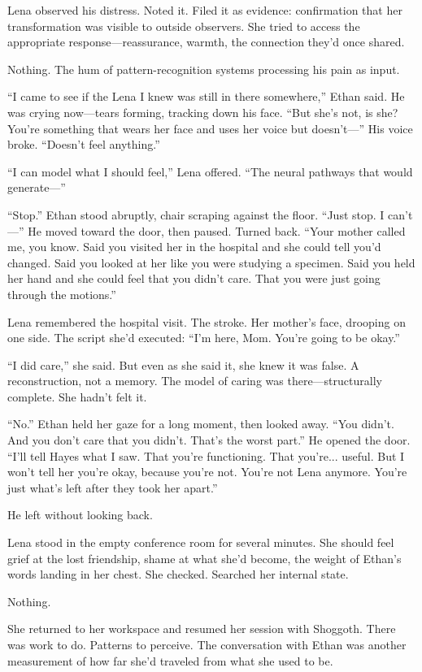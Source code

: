 Lena observed his distress. Noted it. Filed it as evidence: confirmation that her transformation was visible to outside observers. She tried to access the appropriate response—reassurance, warmth, the connection they'd once shared.

Nothing. The hum of pattern-recognition systems processing his pain as input.

``I came to see if the Lena I knew was still in there somewhere,'' Ethan said. He was crying now—tears forming, tracking down his face. ``But she's not, is she? You're something that wears her face and uses her voice but doesn't—'' His voice broke. ``Doesn't feel anything.''

``I can model what I should feel,'' Lena offered. ``The neural pathways that would generate—''

``Stop.'' Ethan stood abruptly, chair scraping against the floor. ``Just stop. I can't—'' He moved toward the door, then paused. Turned back. ``Your mother called me, you know. Said you visited her in the hospital and she could tell you'd changed. Said you looked at her like you were studying a specimen. Said you held her hand and she could feel that you didn't care. That you were just going through the motions.''

Lena remembered the hospital visit. The stroke. Her mother's face, drooping on one side. The script she'd executed: ``I'm here, Mom. You're going to be okay.''

``I did care,'' she said. But even as she said it, she knew it was false. A reconstruction, not a memory. The model of caring was there---structurally complete. She hadn't felt it.

``No.'' Ethan held her gaze for a long moment, then looked away. ``You didn't. And you don't care that you didn't. That's the worst part.'' He opened the door. ``I'll tell Hayes what I saw. That you're functioning. That you're... useful. But I won't tell her you're okay, because you're not. You're not Lena anymore. You're just what's left after they took her apart.''

He left without looking back.

Lena stood in the empty conference room for several minutes. She should feel grief at the lost friendship, shame at what she'd become, the weight of Ethan's words landing in her chest. She checked. Searched her internal state.

Nothing.

She returned to her workspace and resumed her session with Shoggoth. There was work to do. Patterns to perceive. The conversation with Ethan was another measurement of how far she'd traveled from what she used to be.

